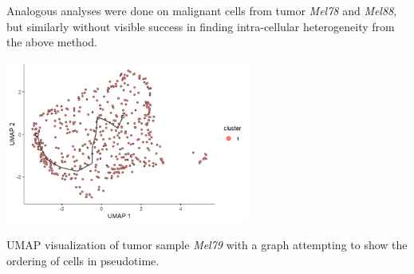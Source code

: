 \documentclass[11pt]{article}
\begin{document}
\begin{multicols}{2}
    Analogous analyses were done on malignant cells from tumor \textit{Mel78} and \textit{Mel88}, but similarly without visible success in finding intra-cellular heterogeneity from the above method.
    
    \begin{center}
        \captionsetup{type=figure}
        \includegraphics[width=8cm]{plots/plot_t-umap-order.png}
        \caption{UMAP visualization of tumor sample \textit{Mel79} with a graph attempting to show the ordering of cells in pseudotime.}
        \label{fig:t-umap-order}
    \end{center}

\end{multicols}

      
\end{document}
